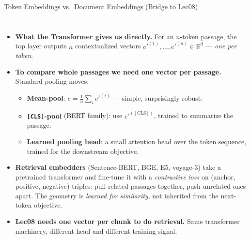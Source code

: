 \begin{frame}{Token Embeddings vs.\ Document Embeddings (Bridge to Lec08)}
\begin{columns}[T]
\footnotesize
\begin{itemize}
\item \textbf{What the Transformer gives us directly.} For an $n$-token passage, the top layer outputs $n$ contextualized vectors $e'^{(1)}, \ldots, e'^{(n)} \in \mathbb{R}^{d}$ --- \emph{one per token}.

\medskip
\item \textbf{To compare whole passages we need one vector per passage.} Standard pooling moves:
\begin{itemize}
    \item \textbf{Mean-pool}: $\bar e = \tfrac{1}{n}\sum_i e'^{(i)}$ --- simple, surprisingly robust.
    \item \textbf{\texttt{[CLS]}-pool} (BERT family): use $e'^{([\text{CLS}])}$, trained to summarize the passage.
    \item \textbf{Learned pooling head}: a small attention head over the token sequence, trained for the downstream objective.
\end{itemize}

\medskip
\item \textbf{Retrieval embedders} (Sentence-BERT, BGE, E5, voyage-3) take a pretrained transformer and fine-tune it with a \emph{contrastive loss} on (anchor, positive, negative) triples: pull related passages together, push unrelated ones apart. The geometry is \emph{learned for similarity}, not inherited from the next-token objective.

\medskip
\item \textbf{Lec08 needs one vector per chunk to do retrieval.} Same transformer machinery, different head and different training signal.
\end{itemize}

\centering
{}
\end{columns}
\end{frame}
